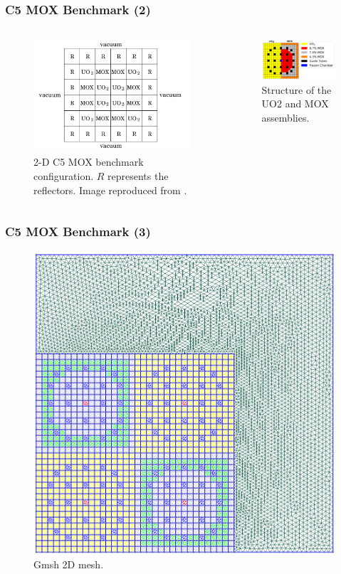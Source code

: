 \begin{frame}
\frametitle{C5 MOX Benchmark (2)}

\begin{columns}
    \column[t]{5.5cm}
    \begin{figure}[htbp!]
        \begin{center}
            \includegraphics[width=6cm]{figures/bench-config}
        \end{center}
        \caption{2-D C5 MOX benchmark configuration. $R$ represents the reflectors. Image reproduced from \cite{capilla_applications_2009}.}
    \end{figure}

    \column[t]{5.5cm}
    \begin{figure}[htbp!]
        \begin{center}
            \includegraphics[width=5.5cm]{figures/bench-config2B}
        \end{center}
        \caption{Structure of the UO2 and MOX assemblies.}
    \end{figure}
\end{columns}
\end{frame}


\begin{frame}
\frametitle{C5 MOX Benchmark (3)}

    \begin{figure}[htbp!]
        \begin{center}
            \includegraphics[width=6.cm]{figures/bench-mesh}
        \end{center}
        \caption{Gmsh 2D mesh.}
    \end{figure}

\end{frame}

